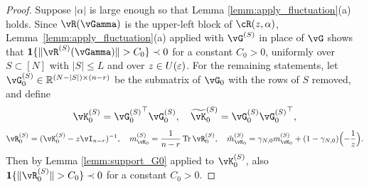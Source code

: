 \begin{proof}
Suppose $|\alpha|$ is large enough so that Lemma \ref{lemm:apply_fluctuation}(a)
holds. Since $\vR(\vGamma)$ is the upper-left block of $\vcR(z,\alpha)$,
Lemma~\ref{lemm:apply_fluctuation}(a) applied with $\vG^{(S)}$ in place of $\vG$
shows that $\bI\{\|\vR^{(S)}(\vGamma)\|>C_0\} \prec 0$ for a constant $C_0>0$,
uniformly over $S \subset [N]$ with $|S| \leq L$ and over $z \in U(\varepsilon)$.
For the remaining statements,
let $\vG_0^{(S)} \in \R^{(N-|S|) \times (n-r)}$ be the submatrix of $\vG_0$ with
the rows of $S$ removed, and define
\[\vK_0^{(S)}={\vG_0^{(S)}}^\top\vG_0^{(S)},
\quad \widetilde \vK_0^{(S)}={\vG_0^{(S)}}{\vG_0^{(S)}}^\top,\]
\[\vR_0^{(S)}=(\vK_0^{(S)}-z\vI_{n-r})^{-1},
\quad m_{\vK_0}^{(S)}=\frac{1}{n-r}\Tr \vR_0^{(S)},
\quad \tilde
m_{\vK_0}^{(S)}=\gamma_{N,0}m_{\vK_0}^{(S)}+(1-\gamma_{N,0})\Big({-}\frac{1}{z}\Big).\]
Then by Lemma \ref{lemm:support_G0} applied to $\vK_0^{(S)}$, also
$\bI\{\|\vR_0^{(S)}\|>C_0\} \prec 0$ for a constant $C_0>0$.


\end{proof}
